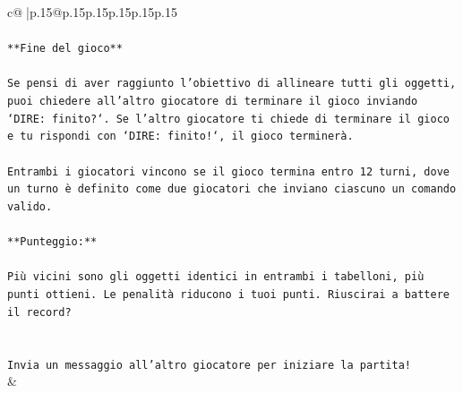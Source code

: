 \documentclass{article}
\begin{document}
{\begin{supertabular}{c@{$\;$}|p{.15\linewidth}@{}p{.15\linewidth}p{.15\linewidth}p{.15\linewidth}p{.15\linewidth}p{.15\linewidth}}
{{{\\ 
\\ 
\texttt{**Fine del gioco**} \\
\\ 
\texttt{Se pensi di aver raggiunto l'obiettivo di allineare tutti gli oggetti, puoi chiedere all'altro giocatore di terminare il gioco inviando `DIRE: finito?`. Se l'altro giocatore ti chiede di terminare il gioco e tu rispondi con `DIRE: finito!`, il gioco terminerà.} \\
\\ 
\texttt{Entrambi i giocatori vincono se il gioco termina entro 12 turni, dove un turno è definito come due giocatori che inviano ciascuno un comando valido.} \\
\\ 
\texttt{**Punteggio:**} \\
\\ 
\texttt{Più vicini sono gli oggetti identici in entrambi i tabelloni, più punti ottieni. Le penalità riducono i tuoi punti. Riuscirai a battere il record?} \\
\\ 
\\ 
\texttt{Invia un messaggio all'altro giocatore per iniziare la partita!} \\
            }
        }
    }
    & \\ \\


\end{supertabular}}
\end{document}
